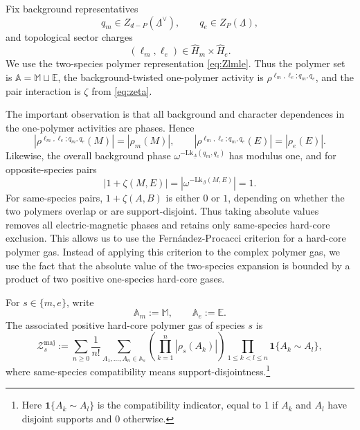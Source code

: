 \documentclass[dvipsnames,a4paper]{article}
\numberwithin{equation}{section}
\theoremstyle{definition}
\theoremstyle{remark}
\newcommand{\Lk}{\mathrm{Lk}}
\begin{document}
Fix background representatives
\begin{equation}
q_m\in Z_{d-P}(\underline\Lambda^\vee),
\qquad
q_e\in Z_P(\underline\Lambda),
\end{equation}
and topological sector charges
\begin{equation}
(\ell_m,\ell_e)\in \widehat H_m\times \widehat H_e.
\end{equation}
We use the two-species polymer representation
\eqref{eq:Zlmle}. Thus the polymer set is
$\mathbb A=\mathbb M \sqcup\mathbb E $,
the background-twisted one-polymer activity is
\(\rho^{\ell_m,\ell_e;q_m,q_e}\), and the pair interaction is \(\zeta\) from
\eqref{eq:zeta}.

The important observation is that all background and character dependences in the
one-polymer activities are phases. Hence
\begin{equation}
	\left|\rho^{\ell_m,\ell_e;q_m,q_e}(M)\right|
	=
	|\rho_m(M)|,
	\qquad
	\left|\rho^{\ell_m,\ell_e;q_m,q_e}(E)\right|
	=
	|\rho_e(E)|.
	\label{eq:background-activity-moduli}
\end{equation}
Likewise, the overall background phase
\(\omega^{-\Lk_{\underline\Lambda}(q_m,q_e)}\) has modulus one, and for
opposite-species pairs
\begin{equation}
	|1+\zeta(M,E)|
	=
	\left|\omega^{-\Lk_{\underline\Lambda}(M,E)}\right|
	=
	1.
	\label{eq:opposite-phase-modulus}
\end{equation}
For same-species pairs, \(1+\zeta(A,B)\) is either \(0\) or \(1\), depending on whether the
two polymers overlap or are support-disjoint. Thus taking absolute values removes all
electric-magnetic phases and retains only same-species hard-core exclusion. This allows us to use the Fern\'andez-Procacci criterion \cite{FernandezProcacci2007} for a hard-core polymer gas. Instead of applying this criterion to the complex polymer gas, we use the fact that the absolute value of the two-species expansion is bounded by a product of two positive one-species hard-core gases.



For \(s\in\{m,e\}\), write
\begin{equation}
\mathbb A_m:=\mathbb M ,
\qquad
\mathbb A_e:=\mathbb E .
\end{equation}
The associated positive hard-core polymer gas of species \(s\) is
\begin{equation}
	\mathcal Z_s^{\mathrm{maj}}
	:=
	\sum_{n\ge 0}
	\frac{1}{n!}
	\sum_{A_1,\dots,A_n\in \mathbb A_s}
	\left(\prod_{k=1}^n |\rho_s(A_k)|\right)
	\prod_{1\le k<l\le n}\mathbf 1\{A_k\sim A_l\},
	\label{eq:majorant-gas}
\end{equation}
where same-species compatibility means support-disjointness.\footnote{Here $\mathbf 1\{A_k\sim A_l\}$ is the compatibility indicator, equal to 1 if $A_k$ and $A_l$ have disjoint supports and 0 otherwise.}
\end{document}
